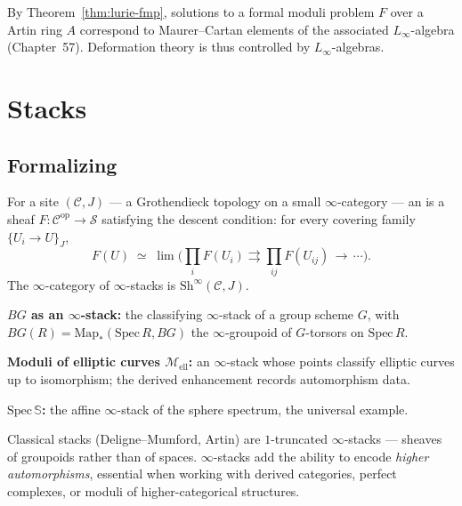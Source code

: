 \begin{remark}
By Theorem~\ref{thm:lurie-fmp}, solutions to a formal moduli problem
$F$ over a Artin ring $A$ correspond to Maurer–Cartan elements of the
associated $L_\infty$-algebra (Chapter~57). Deformation theory is thus
controlled by $L_\infty$-algebras.
\end{remark}


\section{Stacks}
\label{sec:stacks}

\subsection{Formalizing}

\begin{definition}
\label{def:infty-stack}
For a site $(\mathcal{C}, J)$ — a Grothendieck topology on a small
$\infty$-category — an  is a sheaf
$F : \mathcal{C}^{\mathrm{op}} \to \mathcal{S}$ satisfying the descent
condition: for every covering family $\{U_i \to U\}_J$,
\begin{equation*}
  F(U) \;\simeq\; \lim \bigl( \prod_i F(U_i) \rightrightarrows \prod_{ij} F(U_{ij}) \,\to\,\cdots \bigr).
\end{equation*}
The $\infty$-category of $\infty$-stacks is $\mathrm{Sh}^\infty(\mathcal{C}, J)$.
\end{definition}

\begin{example_thm}
\label{ex:infty-stacks}
\textbf{$B G$ as an $\infty$-stack:} the classifying $\infty$-stack of a
group scheme $G$, with $BG(R) = \mathrm{Map}_*(\mathrm{Spec}\, R, BG)$
the $\infty$-groupoid of $G$-torsors on $\mathrm{Spec}\, R$.

\textbf{Moduli of elliptic curves $\mathcal{M}_{\mathrm{ell}}$:} an
$\infty$-stack whose points classify elliptic curves up to isomorphism;
the derived enhancement records automorphism data.

\textbf{$\mathrm{Spec}\,\mathbb{S}$:} the affine $\infty$-stack of the
sphere spectrum, the universal example.
\end{example_thm}

\begin{remark}
Classical stacks (Deligne–Mumford, Artin) are $1$-truncated $\infty$-stacks
— sheaves of groupoids rather than of spaces. $\infty$-stacks add the
ability to encode \emph{higher automorphisms}, essential when working
with derived categories, perfect complexes, or moduli of higher-categorical
structures.
\end{remark}


